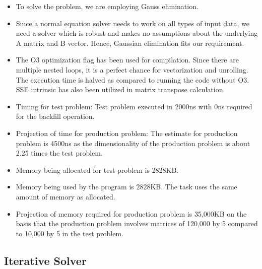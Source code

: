 \documentclass{article}
\begin{document}
\begin{spacing}{1.1}
\begin{itemize}
    \item To solve the problem, we are employing Gauss elimination. 
    \item Since a normal equation solver needs to work on all types of input data, we need a solver which is robust and makes no assumptions about the underlying A matrix and B vector. Hence, Gaussian elimination fits our requirement.
    \item The O3 optimization flag has been used for compilation. Since there are multiple nested loops, it is a perfect chance for vectorization and unrolling. The execution time is halved as compared to running the code without O3. SSE intrinsic has also been utilized in matrix transpose calculation. 
    \item Timing for test problem: \newline Test problem executed in 2000ns with 0ns required for the backfill operation.
    \item Projection of time for production problem: \newline The estimate for production problem is 4500ns as the dimensionality of the production problem is about 2.25 times the test problem.
    \item Memory being allocated for test problem is 2828KB.
    \item  Memory being used by the program is 2828KB. The task uses the same amount of memory as allocated.
    \item Projection of memory required for production problem is 35,000KB on the basis that the production problem involves matrices of 120,000 by 5 compared to 10,000 by 5 in the test problem.
\end{itemize}

\subsection{Iterative Solver}


\end{spacing}
\end{document}
